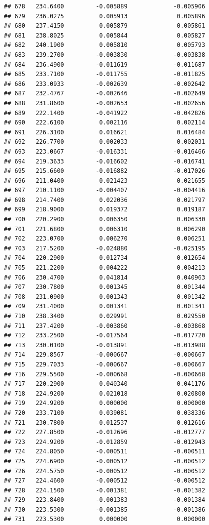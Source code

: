 \documentclass[
]{article}
\begin{document}
\begin{verbatim}
## 678   234.6400         -0.005889             -0.005906
## 679   236.0275          0.005913              0.005896
## 680   237.4150          0.005879              0.005861
## 681   238.8025          0.005844              0.005827
## 682   240.1900          0.005810              0.005793
## 683   239.2700         -0.003830             -0.003838
## 684   236.4900         -0.011619             -0.011687
## 685   233.7100         -0.011755             -0.011825
## 686   233.0933         -0.002639             -0.002642
## 687   232.4767         -0.002646             -0.002649
## 688   231.8600         -0.002653             -0.002656
## 689   222.1400         -0.041922             -0.042826
## 690   222.6100          0.002116              0.002114
## 691   226.3100          0.016621              0.016484
## 692   226.7700          0.002033              0.002031
## 693   223.0667         -0.016331             -0.016466
## 694   219.3633         -0.016602             -0.016741
## 695   215.6600         -0.016882             -0.017026
## 696   211.0400         -0.021423             -0.021655
## 697   210.1100         -0.004407             -0.004416
## 698   214.7400          0.022036              0.021797
## 699   218.9000          0.019372              0.019187
## 700   220.2900          0.006350              0.006330
## 701   221.6800          0.006310              0.006290
## 702   223.0700          0.006270              0.006251
## 703   217.5200         -0.024880             -0.025195
## 704   220.2900          0.012734              0.012654
## 705   221.2200          0.004222              0.004213
## 706   230.4700          0.041814              0.040963
## 707   230.7800          0.001345              0.001344
## 708   231.0900          0.001343              0.001342
## 709   231.4000          0.001341              0.001341
## 710   238.3400          0.029991              0.029550
## 711   237.4200         -0.003860             -0.003868
## 712   233.2500         -0.017564             -0.017720
## 713   230.0100         -0.013891             -0.013988
## 714   229.8567         -0.000667             -0.000667
## 715   229.7033         -0.000667             -0.000667
## 716   229.5500         -0.000668             -0.000668
## 717   220.2900         -0.040340             -0.041176
## 718   224.9200          0.021018              0.020800
## 719   224.9200          0.000000              0.000000
## 720   233.7100          0.039081              0.038336
## 721   230.7800         -0.012537             -0.012616
## 722   227.8500         -0.012696             -0.012777
## 723   224.9200         -0.012859             -0.012943
## 724   224.8050         -0.000511             -0.000511
## 725   224.6900         -0.000512             -0.000512
## 726   224.5750         -0.000512             -0.000512
## 727   224.4600         -0.000512             -0.000512
## 728   224.1500         -0.001381             -0.001382
## 729   223.8400         -0.001383             -0.001384
## 730   223.5300         -0.001385             -0.001386
## 731   223.5300          0.000000              0.000000
\end{verbatim}
\end{document}
